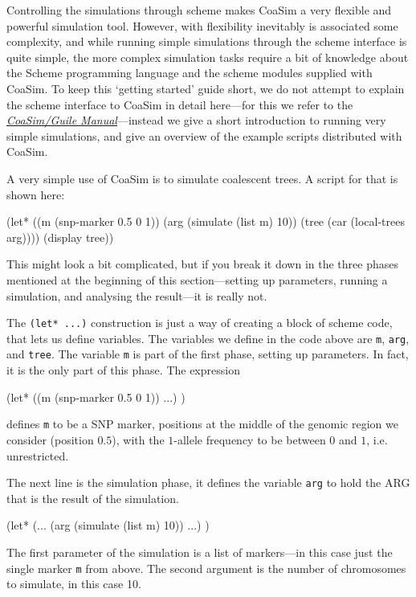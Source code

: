 \documentclass{manual}
\begin{document}
Controlling the simulations through scheme makes CoaSim a very
flexible and powerful simulation tool. However, with flexibility
inevitably is associated some complexity, and while running simple
simulations through the scheme interface is quite simple, the more
complex simulation tasks require a bit of knowledge about the Scheme
programming language and the scheme modules supplied with CoaSim.  To
keep this `getting started' guide short, we do not attempt to explain
the scheme interface to CoaSim in detail here---for this we refer to
the
\href{http://www.daimi.au.dk/~mailund/CoaSim/download/guile-manual-4.1.pdf}%
{\emph{CoaSim/Guile Manual}}---instead we give a short introduction to
running very simple simulations, and give an overview of the example
scripts distributed with CoaSim.

A very simple use of CoaSim is to simulate coalescent trees.  A script
for that is shown here:
\begin{code}
(let* ((m (snp-marker 0.5 0 1))
       (arg (simulate (list m) 10))
       (tree (car (local-trees arg))))
  (display tree))
\end{code}
This might look a bit complicated, but if you break it down in the
three phases mentioned at the beginning of this section---setting up
parameters, running a simulation, and analysing the result---it is
really not.

The \verb?(let* ...)? construction is just a way of creating a block
of scheme code, that lets us define variables.  The variables we
define in the code above are \texttt{m}, \texttt{arg}, and
\texttt{tree}.  The variable \texttt{m} is part of the first phase,
setting up parameters.  In fact, it is the only part of this phase.
The expression
\begin{code}
(let* ((m (snp-marker 0.5 0 1))
       ...)
  )
\end{code}
defines \texttt{m} to be a SNP marker, positions at the middle of the
genomic region we consider (position $0.5$), with the $1$-allele
frequency to be between $0$ and $1$, i.e. unrestricted.

The next line is the simulation phase, it defines the variable
\texttt{arg} to hold the ARG that is the result of the simulation.
\begin{code}
(let* (...
       (arg (simulate (list m) 10))
       ...)
  )
\end{code}

The first parameter of the simulation is a list of markers---in this
case just the single marker \texttt{m} from above.  The second
argument is the number of chromosomes to simulate, in this case 10.
\end{document}
